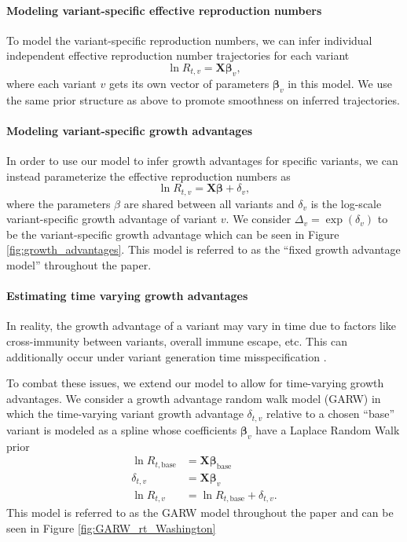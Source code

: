 \documentclass[11pt,oneside,letterpaper]{article}
\renewcommand{\vec}[1]{\boldsymbol{#1}}
\begin{document}
\paragraph{Modeling variant-specific effective reproduction numbers}%

To model the variant-specific reproduction numbers, we can infer individual independent effective reproduction number trajectories for each variant
\begin{equation}
  \ln R_{t, v} = \vec{X} \vec{\beta}_{v},
\end{equation}
where each variant $v$ gets its own vector of parameters $\vec{\beta}_{v}$ in this model.
We use the same prior structure as above to promote smoothness on inferred trajectories.

\paragraph{Modeling variant-specific growth advantages}%

In order to use our model to infer growth advantages for specific variants, we can instead parameterize the effective reproduction numbers as
\begin{equation}
\ln R_{t,v} = \vec{X} \vec{\beta} + \delta_{v},
\end{equation}
where the parameters $\beta$ are shared between all variants and $\delta_{v}$ is the log-scale variant-specific growth advantage of variant $v$.
We consider $\Delta_{v} = \exp(\delta_{v})$ to be the variant-specific growth advantage which can be seen in Figure \ref{fig:growth_advantages}.
This model is referred to as the ``fixed growth advantage model'' throughout the paper.

\paragraph{Estimating time varying growth advantages}
In reality, the growth advantage of a variant may vary in time due to factors like cross-immunity between variants, overall immune escape, etc.
This can additionally occur under variant generation time misspecification \cite{Park2021.05.03.21256545}.

To combat these issues, we extend our model to allow for time-varying growth advantages.
We consider a growth advantage random walk model (GARW) in which the time-varying variant growth advantage $\delta_{t,v}$ relative to a chosen ``base'' variant is modeled as a spline whose coefficients $\vec{\beta}_{v}$ have a Laplace Random Walk prior
\begin{align*}
  \ln R_{t, \text{base}} &= \vec{X} \vec{\beta}_{\text{base}}\\
  \delta_{t, v} &= \vec{X} \vec{\beta}_{v}\\
  \ln R_{t, v} &= \ln R_{t, \text{base}} + \delta_{t, v}.
\end{align*}
This model is referred to as the GARW model throughout the paper and can be seen in Figure \ref{fig:GARW_rt_Washington}
\end{document}
